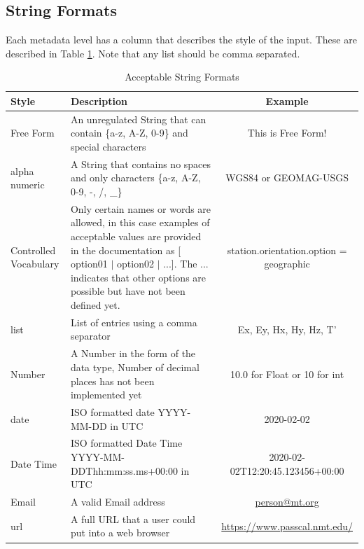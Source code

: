 \documentclass[12pt]{article}
\begin{document}
\subsection{String Formats}

Each metadata level has a column that describes the style of the input.  These are described in Table \ref{tab:values}.  Note that any list should be comma separated.

\begin{table}[htb!]
	\centering
	\caption[Acceptable String Formats]{Acceptable String Formats}
	\begin{tabular}{p{.8in}p{3.1in}c}
		\toprule
		\textbf{Style} & \textbf{Description}  & \textbf{Example} \\ \midrule
		Free Form & An unregulated String that can contain \{a-z, A-Z, 0-9\} and special characters & This is Free Form! \\ \midrule
		
		alpha numeric & A String that contains no spaces and only characters \{a-z, A-Z, 0-9, -, /, \_\} & WGS84 or GEOMAG-USGS \\ \midrule
		Controlled Vocabulary & Only certain names or words are allowed, in this case examples of acceptable values are provided in the documentation as [ option01 $|$ option02 $|$ ...]. The ... indicates that other options are possible but have not been defined yet. &  station.orientation.option = geographic \\ \midrule
		list & List of entries using a comma separator & Ex, Ey, Hx, Hy, Hz, T' \\ \midrule
		Number & A Number in the form of the data type, Number of decimal places has not been implemented yet & 10.0 for Float or 10 for int \\ \midrule
		date & ISO formatted date YYYY-MM-DD in UTC & 2020-02-02 \\ \midrule
		Date Time & ISO formatted Date Time YYYY-MM-DDThh:mm:ss.ms+00:00 in UTC & 2020-02-02T12:20:45.123456+00:00 \\ \midrule
		Email & A valid Email address & \url{person@mt.org} \\ \midrule
		url & A full URL that a user could put into a web browser  &  \url{https://www.passcal.nmt.edu/} \\ \bottomrule
		
		
	\end{tabular}
	\label{tab:values}
\end{table}
\end{document}
